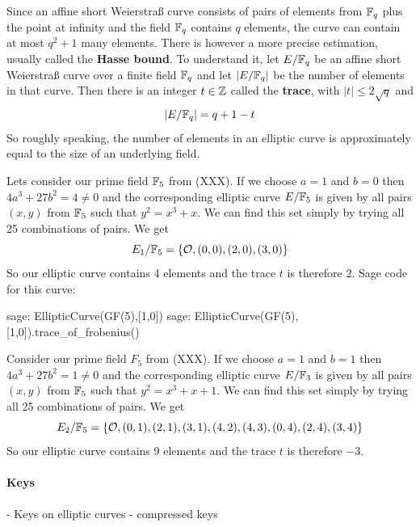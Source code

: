 Since an affine short Weierstraß curve consists of pairs of elements from $\mathbb{F}_q$ plus the point at infinity and the field $\mathbb{F}_q$ contains $q$ elements, the curve can contain at most $q^2+1$ many elements. There is however a more precise estimation, usually called the \textbf{Hasse bound}. To understand it, let $E/\mathbb{F}_q$ be an affine short Weierstraß curve over a finite field $\mathbb{F}_q$ and let $|E/\mathbb{F}_q|$ be the number of elements in that curve. Then there is an integer $t\in \mathbb{Z}$ called the \textbf{trace}, with $|t| \leq 2\sqrt{q}$ and
\begin{equation}
|E/\mathbb{F}_q| = q +1 -t
\end{equation}
So roughly speaking, the number of elements in an elliptic curve is approximately equal to the size of an underlying field.
\begin{example}Lets consider our prime field $\mathbb{F}_5$ from (XXX). If we choose $a=1$ and $b=0$ then $4a^3+ 27b^2 = 4 \neq  0 $ and the corresponding elliptic curve $E/\mathbb{F}_{5}$ is given by all pairs $(x,y)$ from $\mathbb{F}_5$ such that $y^2=x^3+x$. We can find this set simply by trying all 25 combinations of pairs. We get
$$
E_1/\mathbb{F}_5 = \{\mathcal{O}, (0,0),(2,0),(3,0)\}
$$
So our elliptic curve contains 4 elements and the trace $t$ is therefore $2$. Sage code for this curve:
\begin{sagecommandline}
sage: EllipticCurve(GF(5),[1,0])
sage: EllipticCurve(GF(5),[1,0]).trace_of_frobenius()
\end{sagecommandline}
\end{example}
\begin{example}Consider our prime field $F_5$ from (XXX). If we choose $a=1$ and $b=1$ then $4a^3+ 27b^2 = 1 \neq  0 $ and the corresponding elliptic curve $E/\mathbb{F}_{3}$ is given by all pairs $(x,y)$ from $\mathbb{F}_5$ such that $y^2=x^3+x+1$. We can find this set simply by trying all 25 combinations of pairs. We get
$$
E_2/\mathbb{F}_5 = \{\mathcal{O}, (0,1),(2,1),(3,1),(4,2),(4,3),(0,4),(2,4),(3,4)\}
$$
So our elliptic curve contains 9 elements and the trace $t$ is therefore $-3$.
\end{example}

\paragraph{Keys}
- Keys on elliptic curves
- compressed keys



